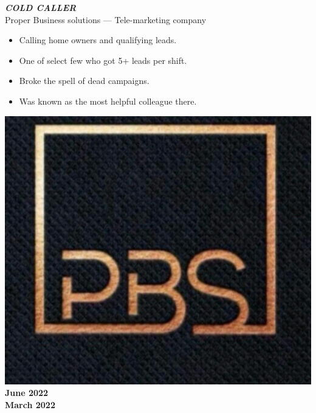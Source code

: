 \documentclass[10pt]{article}
\newcommand{\fancy}[1]{\Large\textbf{\textit{#1}}}
\begin{document}
\vspace{3em}


\noindent
\vspace{2em}
\begin{minipage}{0.7\textwidth}
 \fancy{COLD CALLER} \\
{\large Proper Business solutions --- Tele-marketing company} \\
\begin{itemize}
    \item Calling home owners and qualifying leads.
    \item One of select few who got 5+ leads per shift.
    \item Broke the spell of dead campaigns.
    \item Was known as the most helpful colleague there.
\end{itemize}   
\end{minipage}
\hspace{30pt}
\begin{minipage}{0.2\textwidth}
\begin{center}
\vspace{15pt}
\includegraphics[width=\textwidth]{pbs_lowquality_coldcalling.jpg} \\
    \large\textbf{June 2022\\March 2022}
\end{center}
\end{minipage}
\end{document}

